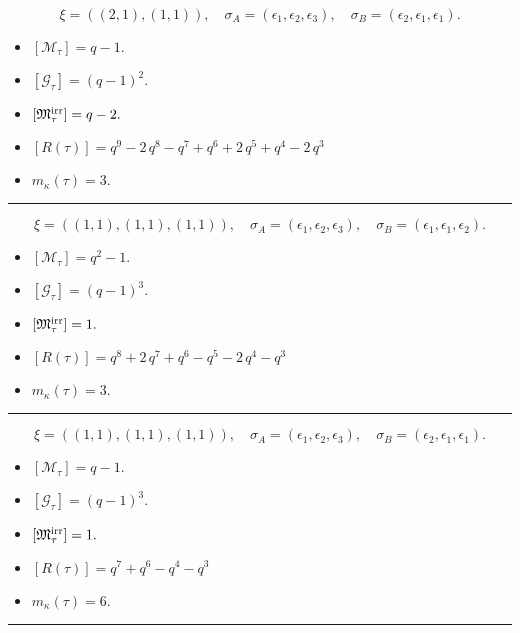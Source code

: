 \documentclass[10pt,a4paper]{amsart}
\begin{document}
$$\xi = ({(2, 1)}, {(1, 1)}),\quad \sigma_A = ({{\epsilon_1, \epsilon_2}}, {{\epsilon_3}}),\quad \sigma_B = ({{\epsilon_2, \epsilon_1}}, {{\epsilon_1}}).$$

\begin{itemize}
 \item $[\mathcal{M}_{\tau}] = q - 1 .$

 \item $[\mathcal{G}_{\tau}] = {\left(q - 1\right)}^{2} .$

 \item $[{\frak M}_{\tau}^{\textrm{irr}}] = q - 2 .$

 \item $[R(\tau)] = q^{9} - 2 \, q^{8} - q^{7} + q^{6} + 2 \, q^{5} + q^{4} - 2 \, q^{3} $

 \item $m_{\kappa}(\tau) = 3 .$

 \end{itemize}
\noindent\rule{8cm}{0.4pt}

$$\xi = ({(1, 1), (1, 1)}, {(1, 1)}),\quad \sigma_A = ({{\epsilon_1}, {\epsilon_2}}, {{\epsilon_3}}),\quad \sigma_B = ({{\epsilon_1}, {\epsilon_1}}, {{\epsilon_2}}).$$

\begin{itemize}
 \item $[\mathcal{M}_{\tau}] = q^{2} - 1 .$

 \item $[\mathcal{G}_{\tau}] = {\left(q - 1\right)}^{3} .$

 \item $[{\frak M}_{\tau}^{\textrm{irr}}] = 1 .$

 \item $[R(\tau)] = q^{8} + 2 \, q^{7} + q^{6} - q^{5} - 2 \, q^{4} - q^{3} $

 \item $m_{\kappa}(\tau) = 3 .$

 \end{itemize}
\noindent\rule{8cm}{0.4pt}

$$\xi = ({(1, 1), (1, 1)}, {(1, 1)}),\quad \sigma_A = ({{\epsilon_1}, {\epsilon_2}}, {{\epsilon_3}}),\quad \sigma_B = ({{\epsilon_2}, {\epsilon_1}}, {{\epsilon_1}}).$$

\begin{itemize}
 \item $[\mathcal{M}_{\tau}] = q - 1 .$

 \item $[\mathcal{G}_{\tau}] = {\left(q - 1\right)}^{3} .$

 \item $[{\frak M}_{\tau}^{\textrm{irr}}] = 1 .$

 \item $[R(\tau)] = q^{7} + q^{6} - q^{4} - q^{3} $

 \item $m_{\kappa}(\tau) = 6 .$

 \end{itemize}
\noindent\rule{8cm}{0.4pt}
\end{document}
